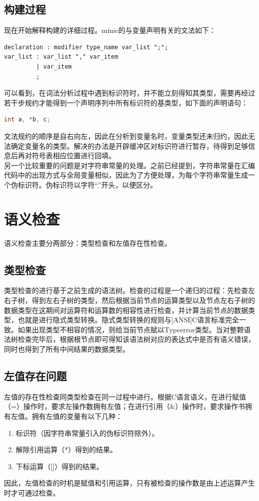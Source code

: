 \documentclass[12pt,a4paper,Flow]{report}
\begin{document}
\subsection{构建过程}
现在开始解释构建的详细过程。minic的与变量声明有关的文法如下：
\begin{verbatim}
declaration : modifier type_name var_list ";";
var_list : var_list "," var_item
         | var_item
         ;
\end{verbatim}
可以看到，在词法分析过程中遇到标识符时，并不能立刻得知其类型，需要再经过若干步规约才能得到一个声明序列中所有标识符的基类型，如下面的声明语句：
\begin{lstlisting}[language=c]
  int a, *b, c;
\end{lstlisting}
文法规约的顺序是自右向左，因此在分析到变量名时，变量类型还未归约，因此无法确定变量名的类型。解决的办法是开辟缓冲区对标识符进行暂存，待得到足够信息后再对符号表相应位置进行回填。\\
\indent 另一个比较重要的问题是对字符串常量的处理。之前已经提到，字符串常量在汇编代码中的出现方式与全局变量相似，因此为了方便处理，为每个字符串常量生成一个伪标识符。伪标识符以字符“.”开头，以便区分。
\section{语义检查}
语义检查主要分两部分：类型检查和左值存在性检查。
\subsection{类型检查}
\indent 类型检查的进行基于之前生成的语法树。检查的过程是一个递归的过程：先检查左右子树，得到左右子树的类型，然后根据当前节点的运算类型以及节点左右子树的数据类型在这期间对运算符和运算数的相容性进行检查，并计算当前节点的数据类型，也就是进行隐式类型转换。隐式类型转换的规则与[ANSI]C语言标准完全一致。如果出现类型不相容的情况，则给当前节点赋以Typeerror类型。当对整颗语法树检查完毕后，根据根节点即可得知该语法树对应的表达式中是否有语义错误，同时也得到了所有中间结果的数据类型。
\subsection{左值存在问题}
左值的存在性检查同类型检查在同一过程中进行。根据C语言语义，在进行赋值（=）操作时，要求左操作数拥有左值；在进行引用（\&）操作时，要求操作书拥有左值。拥有左值的变量有以下几种：
\begin{enumerate}
\item 标识符（因字符串常量引入的伪标识符除外）。
\item 解除引用运算（*）得到的结果。
\item 下标运算（[]）得到的结果。
\end{enumerate}
因此，左值检查的时机是赋值和引用运算，只有被检查的操作数是由上述运算产生时才可通过检查。
\end{document}
